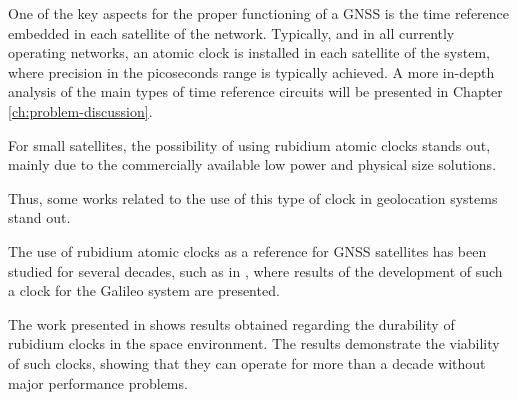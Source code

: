 


One of the key aspects for the proper functioning of a GNSS is the time reference embedded in each satellite of the network. Typically, and in all currently operating networks, an atomic clock is installed in each satellite of the system, where precision in the picoseconds range is typically achieved. A more in-depth analysis of the main types of time reference circuits will be presented in Chapter \autoref{ch:problem-discussion}.

For small satellites, the possibility of using rubidium atomic clocks stands out, mainly due to the commercially available low power and physical size solutions.

Thus, some works related to the use of this type of clock in geolocation systems stand out.

The use of rubidium atomic clocks as a reference for GNSS satellites has been studied for several decades, such as in \cite{jeanmaire1999}, where results of the development of such a clock for the Galileo system are presented.

The work presented in \cite{camparo2012} shows results obtained regarding the durability of rubidium clocks in the space environment. The results demonstrate the viability of such clocks, showing that they can operate for more than a decade without major performance problems.

